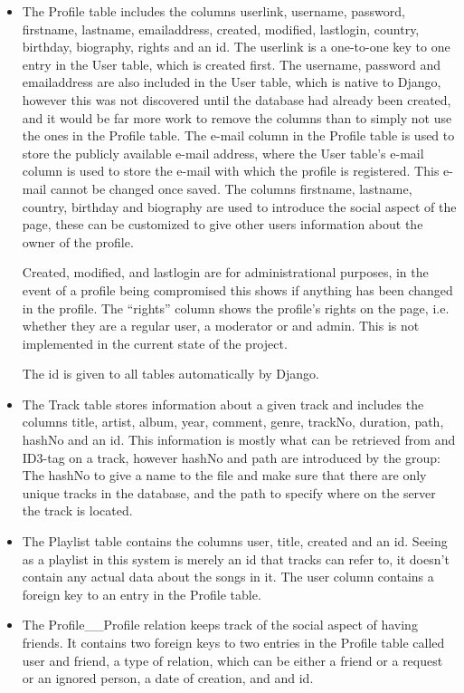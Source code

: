 \begin{itemize}
\item The Profile table includes the columns userlink, username, password, firstname, lastname, emailaddress, created, modified, lastlogin, country, birthday, biography, rights and an id.  The userlink is a one-to-one key to one entry in the User table, which is created first. The username, password and emailaddress are also included in the User table, which is native to Django, however this was not discovered until the database had already been created, and it would be far more work to remove the columns than to simply not use the ones in the Profile table. The e-mail column in the Profile table is used to store the publicly available e-mail address, where the User table's e-mail column is used to store the e-mail with which the profile is registered. This e-mail cannot be changed once saved. The columns firstname, lastname, country, birthday and biography are used to introduce the social aspect of the page, these can be customized to give other users information about the owner of the profile. 

Created, modified, and lastlogin are for administrational purposes, in the event of a profile being compromised this shows if anything has been changed in the profile. The ``rights'' column shows the profile's rights on the page, i.e. whether they are a regular user, a moderator or and admin. This is not implemented in the current state of the project. 

The id is given to all tables automatically by Django.

\item The Track table stores information about a given track and includes the columns title, artist, album, year, comment, genre, trackNo, duration, path, hashNo and an id. This information is mostly what can be retrieved from and ID3-tag on a track, however hashNo and path are introduced by the group: The hashNo to give a name to the file and make sure that there are only unique tracks in the database, and the path to specify where on the server the track is located. 

\item The Playlist table contains the columns user, title, created and an id. Seeing as a playlist in this system is merely an id that tracks can refer to, it doesn't contain any actual data about the songs in it. The user column contains a foreign key to an entry in the Profile table.

\item The Profile\_\_Profile relation keeps track of the social aspect of having friends. It contains two foreign keys to two entries in the Profile table called user and friend, a type of relation, which can be either a friend or a request or an ignored person, a date of creation, and and id.


\end{itemize}
